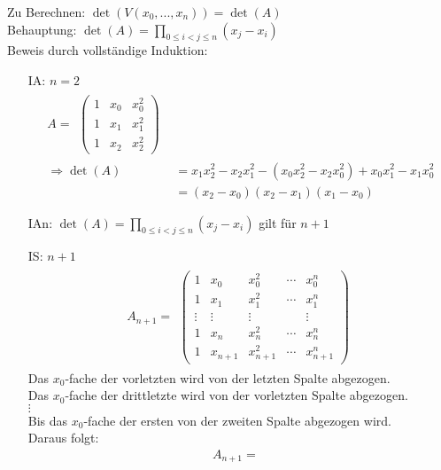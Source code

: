 Zu Berechnen: $\det(V(x_0,...,x_n))=\det(A)$\\
Behauptung: $\det(A) = \prod \limits_{0 \leq i < j \leq n}(x_j-x_i)$\\
Beweis durch vollständige Induktion:\\
\begin{itemize}
	\item[IA:] $n=2$\\
	\begin{align*}
	A =
	\begin{split}
	\begin{pmatrix}
	1 & x_0 & x_0^2 \\
	1 & x_1 & x_1^2 \\
	1 & x_2 & x_2^2 
	\end{pmatrix}
	\end{split}\\
	\Rightarrow \det(A) &= x_1x_2^2-x_2x_1^2-(x_0x_2^2-x_2x_0^2)+x_0x_1^2-x_1x_0^2\\
	&= (x_2-x_0)(x_2-x_1)(x_1-x_0)
	\end{align*}
	\item[IAn:] $\det(A)=\prod \limits_{0 \leq i < j \leq n}(x_j-x_i)$ gilt für $n+1$
	\item[IS:] $n+1$\\
	\begin{align*}
	A_{n+1}=
	\begin{split}
	\begin{pmatrix}
	1 & x_0 & x_0^2 & \cdots & x_0^{n} \\
	1 & x_1 & x_1^2 & \cdots & x_1^{n} \\
	\vdots & \vdots & \vdots &  & \vdots \\
	1 & x_n & x_n^2 & \cdots & x_n^{n}\\
	1 & x_{n+1} & x_{n+1}^2 & \cdots & x_{n+1}^{n}
	\end{pmatrix}
	\end{split}
	\end{align*}
	Das $x_0$-fache der vorletzten wird von der letzten Spalte abgezogen.\\
	Das $x_0$-fache der drittletzte wird von der vorletzten Spalte abgezogen.\\
	$\vdots$\\
	Bis das $x_0$-fache der ersten von der zweiten Spalte abgezogen wird.\\
	Daraus folgt:\\
	\begin{align*}
	A_{n+1}=
	\begin{split}

\end{split}
\end{align*}
\end{itemize}
